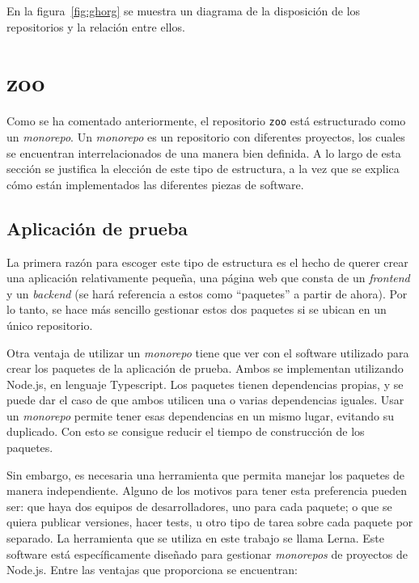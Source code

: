 En la figura~\ref{fig:ghorg} se muestra un diagrama de la disposición de los repositorios y la relación entre ellos.

\section{zoo}

Como se ha comentado anteriormente, el repositorio \texttt{zoo} está estructurado como un \textit{monorepo}. Un \textit{monorepo} es un repositorio con diferentes proyectos, los cuales se encuentran interrelacionados de una manera bien definida. A lo largo de esta sección se justifica la elección de este tipo de estructura, a la vez que se explica cómo están implementados las diferentes piezas de software.

\subsection*{Aplicación de prueba}

La primera razón para escoger este tipo de estructura es el hecho de querer crear una aplicación relativamente pequeña, una página web que consta de un \textit{frontend} y un \textit{backend} (se hará referencia a estos como ``paquetes'' a partir de ahora). Por lo tanto, se hace más sencillo gestionar estos dos paquetes si se ubican en un único repositorio.

Otra ventaja de utilizar un \textit{monorepo} tiene que ver con el software utilizado para crear los paquetes de la aplicación de prueba. Ambos se implementan utilizando Node.js, en lenguaje Typescript\cite{ts}. Los paquetes tienen dependencias propias, y se puede dar el caso de que ambos utilicen una o varias dependencias iguales. Usar un \textit{monorepo} permite tener esas dependencias en un mismo lugar, evitando su duplicado. Con esto se consigue reducir el tiempo de construcción de los paquetes.

Sin embargo, es necesaria una herramienta que permita manejar los paquetes de manera independiente. Alguno de los motivos para tener esta preferencia pueden ser: que haya dos equipos de desarrolladores, uno para cada paquete; o que se quiera publicar versiones, hacer tests, u otro tipo de tarea sobre cada paquete por separado. La herramienta que se utiliza en este trabajo se llama Lerna\cite{lerna}. Este software está específicamente diseñado para gestionar \textit{monorepos} de proyectos de Node.js. Entre las ventajas que proporciona se encuentran:

